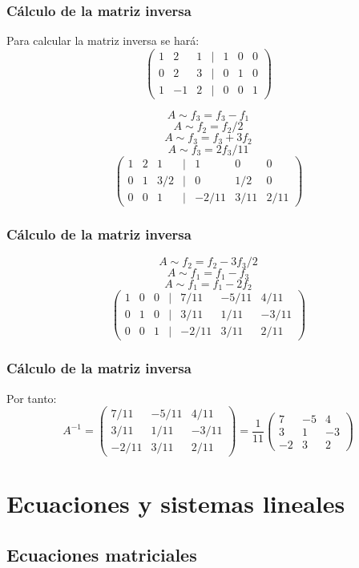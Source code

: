 \documentclass[aspectratio=169]{beamer}
\begin{document}
  
  
      \begin{frame}
  \frametitle{C\'alculo de la matriz inversa}
Para calcular la matriz inversa se har\'a:
\[ \left(\begin{array}{ccccccc}1 & 2 & 1 & | & 1&0&0 \\0 & 2 & 3 &|&0&1&0 \\1 & -1 & 2&|&0&0&1\end{array}\right)\]

\[A\sim f_3 = f_3-f_1\]
\[A\sim f_2 = f_2/2\]
\[A\sim f_3 = f_3+3f_2\]
\[A\sim f_3 = 2f_3/11\]
\[ \left(\begin{array}{ccccccc}1 & 2 & 1 & | &1&0&0 \\0 & 1 & 3/2 &|&0&1/2&0 \\0 & 0 & 1&|&-2/11&3/11&2/11\end{array}\right)\]
  \end{frame} 


     \begin{frame}
  \frametitle{C\'alculo de la matriz inversa}

\[A\sim f_2 = f_2-3f_3/2\]
\[A\sim f_1 = f_1-f_3\]
\[A\sim f_1 = f_1-2f_2\]
\[ \left(\begin{array}{ccccccc}1 & 0 & 0 & | &7/11&-5/11&4/11 \\0 & 1 & 0 &|&3/11&1/11&-3/11 \\0 & 0 & 1&|&-2/11&3/11&2/11\end{array}\right)\]
  \end{frame} 
  
       \begin{frame}
  \frametitle{C\'alculo de la matriz inversa}
Por tanto:
\[A^{-1}= \left(\begin{array}{ccc}7/11&-5/11&4/11 \\3/11&1/11&-3/11 \\-2/11&3/11&2/11\end{array}\right) =
\frac{1}{11}\left(\begin{array}{ccc}7&-5&4 \\3&1&-3 \\-2&3&2\end{array}\right) \]
  \end{frame} 
  
    \section{Ecuaciones y sistemas lineales}
  \subsection{Ecuaciones matriciales}
\end{document}

